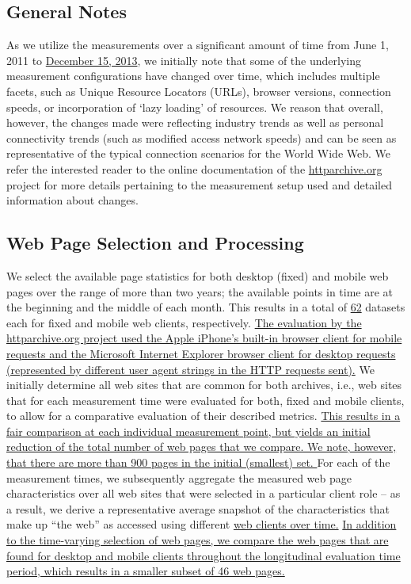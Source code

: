 \documentclass[onecolumn,12pt]{IEEEtran}
\begin{document}
\subsection{General Notes}
As we utilize the measurements over a significant amount of time from June 1, 2011 to \uline{December 15, 2013}, we initially note that some of the underlying measurement configurations have changed over time, which includes multiple facets, such as Unique Resource Locators (URLs), browser versions, connection speeds, or incorporation of `lazy loading' of resources.
We reason that overall, however, the changes made were reflecting industry trends as well as personal connectivity trends (such as modified access network speeds) and can be seen as representative of the typical connection scenarios for the World Wide Web.
We refer the interested reader to the online documentation of the \url{httparchive.org} project for more details pertaining to the measurement setup used and detailed information about changes.

\subsection{Web Page Selection and Processing}
We select the available page statistics for both desktop (fixed) and mobile web pages over the range of more than two years; the available points in time are at the beginning and the middle of each month.
This results in a total of \uline{62} datasets each for fixed and mobile web clients, respectively.
\uline{The evaluation by the httparchive.org project used the Apple iPhone's built-in browser client for mobile requests and the Microsoft Internet Explorer browser client for desktop requests (represented by different user agent strings in the HTTP requests sent).}
We initially determine all web sites that are common for both archives, i.e., web sites that for each measurement time were evaluated for both, fixed and mobile clients, to allow for a comparative evaluation of their described metrics.
\uline{This results in a fair comparison at each individual measurement point, but yields an initial reduction of the total number of web pages that we compare. We note, however, that there are more than 900 pages in the initial (smallest) set. }
For each of the measurement times, we subsequently aggregate the measured web page characteristics over all web sites that were selected in a particular client role -- as a result, we derive a representative average snapshot of the characteristics that make up ``the web'' as accessed using different \uline{web clients over time.} 
\uline{In addition to the time-varying selection of web pages, we compare the web pages that are found for desktop and mobile clients throughout the longitudinal evaluation time period, which results in a smaller subset of 46 web pages.}
\end{document}
